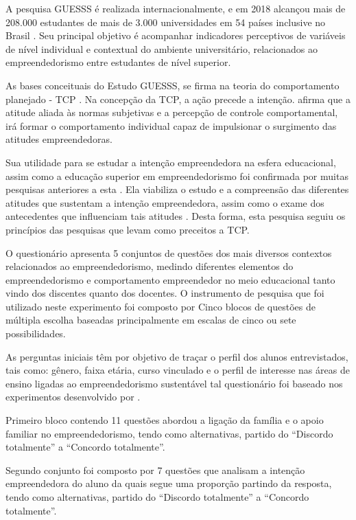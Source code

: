 A pesquisa GUESSS é realizada internacionalmente, e em 2018 alcançou mais de 208.000 estudantes de mais de 3.000 universidades em 54 países inclusive no Brasil \cite{sieger_global_2018}.  Seu  principal  objetivo  é  acompanhar  indicadores perceptivos   de   variáveis   de   nível individual   e   contextual   do   ambiente   universitário, relacionados ao empreendedorismo entre estudantes de nível superior.


As bases conceituais do Estudo GUESSS, se firma na teoria do comportamento planejado - TCP \cite{ajzen_perceived_2002}. Na concepção da TCP, a ação precede a intenção.  afirma que a atitude aliada às normas subjetivas e a percepção de controle comportamental, irá formar o comportamento individual capaz de impulsionar o surgimento das atitudes empreendedoras.

Sua utilidade para se estudar a intenção empreendedora na esfera educacional, assim como a  educação superior em empreendedorismo foi confirmada por muitas pesquisas anteriores a esta \cite{krueger_potencial_2018,gonzalez_predictors_2009,fayolle_effect_2006} . Ela viabiliza o estudo e a compreensão das diferentes atitudes que sustentam a intenção empreendedora, assim como o exame dos antecedentes que influenciam tais atitudes \cite{lima_educacao_2014}. Desta forma, esta pesquisa seguiu os princípios das pesquisas que levam como preceitos a TCP.

O questionário apresenta 5 conjuntos de questões dos mais diversos contextos relacionados ao empreendedorismo, medindo diferentes elementos do empreendedorismo e comportamento empreendedor no meio educacional tanto vindo dos discentes quanto dos docentes. O instrumento de pesquisa que foi utilizado neste experimento foi composto por Cinco blocos de questões de múltipla escolha baseadas principalmente em escalas de cinco ou sete possibilidades.

As perguntas iniciais têm por objetivo de traçar o perfil dos alunos entrevistados, tais como: gênero, faixa etária, curso vinculado e o perfil de interesse nas áreas de ensino ligadas ao empreendedorismo sustentável tal questionário foi baseado nos experimentos desenvolvido por . 

Primeiro bloco contendo 11 questões abordou a ligação da família e o apoio familiar no empreendedorismo, tendo como alternativas, partido do “Discordo totalmente” a “Concordo totalmente”.

Segundo conjunto foi composto por 7 questões que analisam a intenção empreendedora do aluno da quais segue uma proporção partindo da resposta, tendo como alternativas, partido do “Discordo totalmente” a “Concordo totalmente”.

